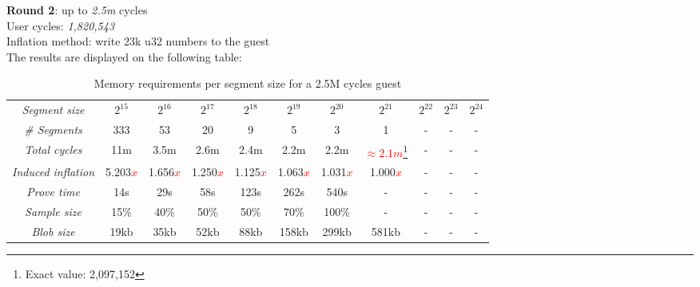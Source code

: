 \documentclass[a4paper, 10pt]{article}
\begin{document}
\par \noindent
\textbf{Round 2}: up to \textit{2.5m} cycles\\
User cycles: \textit{1,820,543}\\
Inflation method: write 23k u32 numbers to the guest\\
The results are displayed on the following table:
\begin{table}[H]
  	\begin{center}
    \label{tab:table3}
    \begin{minipage}{\textwidth}
    \begin{adjustbox}{width=\textwidth}
    \begin{tabular}{c|c|c|c|c|c|c|c|c|c|c}
	  \textit{Segment size} & $2^{15}$ & $2^{16}$ & $2^{17}$ & $2^{18}$ & $2^{19}$ & $2^{20}$ & $2^{21}$ & $2^{22}$ & $2^{23}$ & $2^{24}$\\
	  \textit{\# Segments} & 333 & 53 & 20 & 9 & 5 & 3 & 1 & - & - & -\\
	  \textit{Total cycles} & 11m & 3.5m & 2.6m & 2.4m & 2.2m & 2.2m & \textcolor{red}{$\approx 2.1m$}\footnote{Exact value: 2,097,152} & - & - & -\\
	  \textit{Induced inflation} & 5.203\textcolor{red}{$x$} & 1.656\textcolor{red}{$x$} & 1.250\textcolor{red}{$x$} & 1.125\textcolor{red}{$x$} & 1.063\textcolor{red}{$x$} & 1.031\textcolor{red}{$x$} & 1.000\textcolor{red}{$x$} & - & - & -\\
	  \textit{Prove time} & 14s & 29s & 58s & 123s & 262s & 540s & - & - & - & -\\
	  \textit{Sample size} & 15\% & 40\% & 50\% & 50\% & 70\% & 100\% & - & - & - & -\\
	  \textit{Blob size} & 19kb & 35kb & 52kb & 88kb &158kb & 299kb & 581kb & - & - & -\\
   	\end{tabular}
   	\end{adjustbox}
   	\end{minipage}
    \caption{Memory requirements per segment size for a 2.5M cycles guest}
  \end{center}
\end{table}
\end{document}
